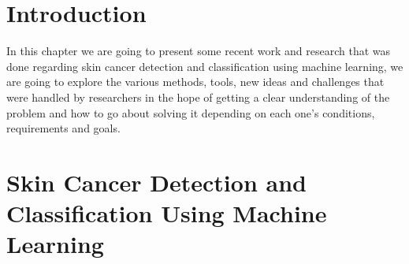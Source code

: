 \section{Introduction}
In this chapter we are going to present some recent work and research that was done regarding skin cancer detection and classification using machine learning, we are going to explore the various methods, tools, new ideas and challenges that were handled by researchers in the hope of getting a clear understanding of the problem and how to go about solving it depending on each one's conditions, requirements and goals.



\section{Skin Cancer Detection and Classification Using Machine Learning}
